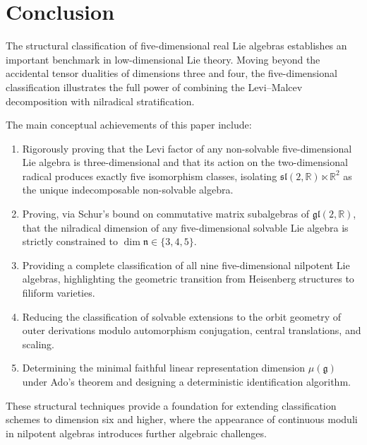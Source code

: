 \documentclass[11pt,a4paper]{article}
\theoremstyle{definition}
\theoremstyle{remark}
\newcommand{\R}{\mathbb{R}}
\newcommand{\g}{\mathfrak{g}}
\newcommand{\n}{\mathfrak{n}}
\begin{document}
\section{Conclusion}\label{sec:conclusion}

The structural classification of five-dimensional real Lie algebras establishes an important benchmark in low-dimensional Lie theory. Moving beyond the accidental tensor dualities of dimensions three and four, the five-dimensional classification illustrates the full power of combining the Levi--Malcev decomposition with nilradical stratification.

The main conceptual achievements of this paper include:
\begin{enumerate}
    \item Rigorously proving that the Levi factor of any non-solvable five-dimensional Lie algebra is three-dimensional and that its action on the two-dimensional radical produces exactly five isomorphism classes, isolating $\mathfrak{sl}(2,\R) \ltimes \R^2$ as the unique indecomposable non-solvable algebra.
    \item Proving, via Schur's bound on commutative matrix subalgebras of $\mathfrak{gl}(2,\R)$, that the nilradical dimension of any five-dimensional solvable Lie algebra is strictly constrained to $\dim \n \in \{3, 4, 5\}$.
    \item Providing a complete classification of all nine five-dimensional nilpotent Lie algebras, highlighting the geometric transition from Heisenberg structures to filiform varieties.
    \item Reducing the classification of solvable extensions to the orbit geometry of outer derivations modulo automorphism conjugation, central translations, and scaling.
    \item Determining the minimal faithful linear representation dimension $\mu(\g)$ under Ado's theorem and designing a deterministic identification algorithm.
\end{enumerate}

These structural techniques provide a foundation for extending classification schemes to dimension six and higher, where the appearance of continuous moduli in nilpotent algebras introduces further algebraic challenges.
\end{document}
